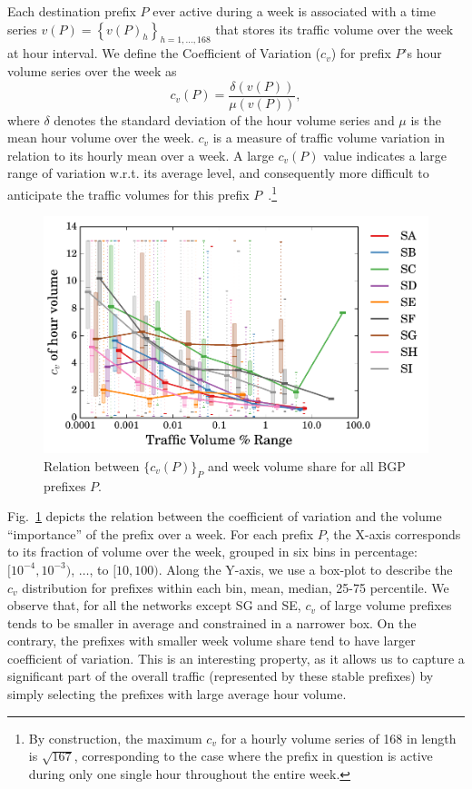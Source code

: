 Each destination prefix $P$ ever active during a week is associated with a time series $v(P)={\left\{ v(P)_h\right\} }_{h=1, \dots, 168}$ that
stores its traffic volume over the week at hour interval. 
We define the Coefficient of Variation ($c_v$) for prefix $P$'s hour volume series over the week as
\begin{equation*}
c_v(P) = \frac{\delta(v(P))}{\mu(v(P))},
\label{eq:cv}
\end{equation*}
where $\delta$ denotes the standard deviation of the hour volume series and $\mu$ is the mean hour volume over the week.
$c_v$ is a measure of traffic volume variation in relation to its hourly mean over a week.
A large $c_v(P)$ value indicates a large range of variation w.r.t. its average level, and consequently more difficult to anticipate the traffic volumes for this prefix $P$~\cite{He2005}.\footnote{By construction, the maximum $c_v$ for a hourly volume series of 168 in length is $\sqrt{167}$, corresponding to the case where the prefix in question is active during only one single hour throughout the entire week.}

\begin{figure}[!htb]
\centering
\includegraphics[width=1\textwidth]{gfx/chap2/cv_bin.pdf}
\caption{Relation between $\{c_v(P)\}_P$  and  week volume share for all BGP prefixes $P$. 
}
\label{fig:cv}
\end{figure}

Fig.~\ref{fig:cv} depicts the relation between the coefficient of variation and the volume ``importance'' of the prefix over a week. For each prefix $P$,  the X-axis corresponds to its fraction of volume over the week, grouped in six bins in percentage: $[10^{-4}, 10^{-3})$, $\dots$, to $[10,100)$. Along the Y-axis, we use a  box-plot to describe the $c_v$ distribution for prefixes within each bin, mean, median, 25-75 percentile.
We observe that, for all the networks except SG and SE, $c_v$ of large volume prefixes tends to be smaller in average and constrained in a narrower box. On the contrary, the prefixes with smaller week volume share tend to have larger coefficient of variation. 
This is an interesting property, as it allows us to capture a significant part of the overall traffic (represented by these stable prefixes) by simply selecting the prefixes with large average hour volume. 

